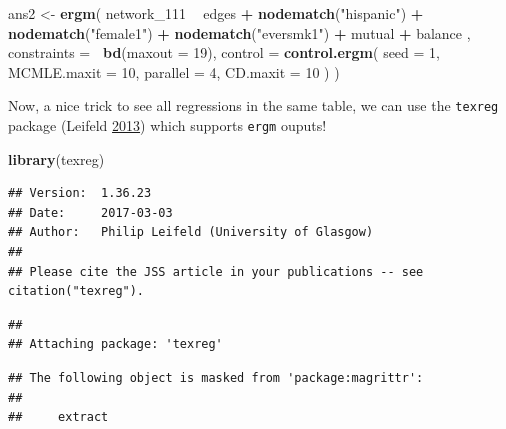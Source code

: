 \documentclass[]{book}
\newenvironment{Shaded}{\begin{snugshade}}{\end{snugshade}}
\newcommand{\KeywordTok}[1]{\textcolor[rgb]{0.13,0.29,0.53}{\textbf{#1}}}
\newcommand{\DataTypeTok}[1]{\textcolor[rgb]{0.13,0.29,0.53}{#1}}
\newcommand{\DecValTok}[1]{\textcolor[rgb]{0.00,0.00,0.81}{#1}}
\newcommand{\StringTok}[1]{\textcolor[rgb]{0.31,0.60,0.02}{#1}}
\newcommand{\OperatorTok}[1]{\textcolor[rgb]{0.81,0.36,0.00}{\textbf{#1}}}
\newcommand{\NormalTok}[1]{#1}
\theoremstyle{definition}
\theoremstyle{definition}
\theoremstyle{definition}
\theoremstyle{remark}
\begin{document}
\begin{Shaded}
\begin{Highlighting}[]
\NormalTok{ans2 <-}\StringTok{ }\KeywordTok{ergm}\NormalTok{(}
\NormalTok{  network_}\DecValTok{111} \OperatorTok{~}
\StringTok{    }\NormalTok{edges }\OperatorTok{+}
\StringTok{    }\KeywordTok{nodematch}\NormalTok{(}\StringTok{"hispanic"}\NormalTok{) }\OperatorTok{+}
\StringTok{    }\KeywordTok{nodematch}\NormalTok{(}\StringTok{"female1"}\NormalTok{) }\OperatorTok{+}
\StringTok{    }\KeywordTok{nodematch}\NormalTok{(}\StringTok{"eversmk1"}\NormalTok{) }\OperatorTok{+}\StringTok{ }
\StringTok{    }\NormalTok{mutual }\OperatorTok{+}
\StringTok{    }\NormalTok{balance}
\NormalTok{    ,}
  \DataTypeTok{constraints =} \OperatorTok{~}\KeywordTok{bd}\NormalTok{(}\DataTypeTok{maxout =} \DecValTok{19}\NormalTok{),}
  \DataTypeTok{control =} \KeywordTok{control.ergm}\NormalTok{(}
    \DataTypeTok{seed        =} \DecValTok{1}\NormalTok{,}
    \DataTypeTok{MCMLE.maxit =} \DecValTok{10}\NormalTok{,}
    \DataTypeTok{parallel    =} \DecValTok{4}\NormalTok{,}
    \DataTypeTok{CD.maxit    =} \DecValTok{10}
\NormalTok{    )}
\NormalTok{  )}
\end{Highlighting}
\end{Shaded}

Now, a nice trick to see all regressions in the same table, we can use
the \texttt{texreg} package (Leifeld
\protect\hyperlink{ref-R-texreg}{2013}) which supports \texttt{ergm}
ouputs!

\begin{Shaded}
\begin{Highlighting}[]
\KeywordTok{library}\NormalTok{(texreg)}
\end{Highlighting}
\end{Shaded}

\begin{verbatim}
## Version:  1.36.23
## Date:     2017-03-03
## Author:   Philip Leifeld (University of Glasgow)
## 
## Please cite the JSS article in your publications -- see citation("texreg").
\end{verbatim}

\begin{verbatim}
## 
## Attaching package: 'texreg'
\end{verbatim}

\begin{verbatim}
## The following object is masked from 'package:magrittr':
## 
##     extract
\end{verbatim}
\end{document}
